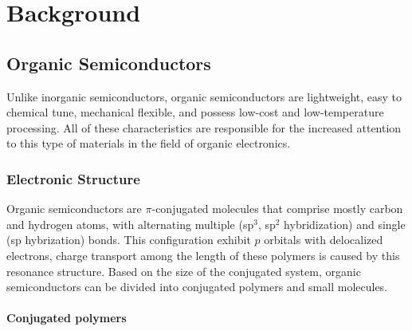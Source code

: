 \chapter{Background} \label{chap:background}

\section{Organic Semiconductors}

Unlike inorganic semiconductors, organic semiconductors are lightweight, easy to chemical tune, mechanical flexible, and possess low-cost and low-temperature processing. All of these characteristics are responsible for the increased attention to this type of materials in the field of organic electronics. 


\subsection{Electronic Structure} 

Organic semiconductors are $\pi$-conjugated molecules that comprise mostly carbon and hydrogen atoms, with alternating multiple (sp$^{3}$, sp$^{2}$ hybridization) and single (sp hybrization) bonds. This configuration exhibit $p$ orbitals with delocalized electrons, charge transport among the length of these polymers is caused by this resonance structure. Based on the size of the conjugated system, organic semiconductors can be divided into conjugated polymers and small molecules.

\subsubsection{Conjugated polymers}

